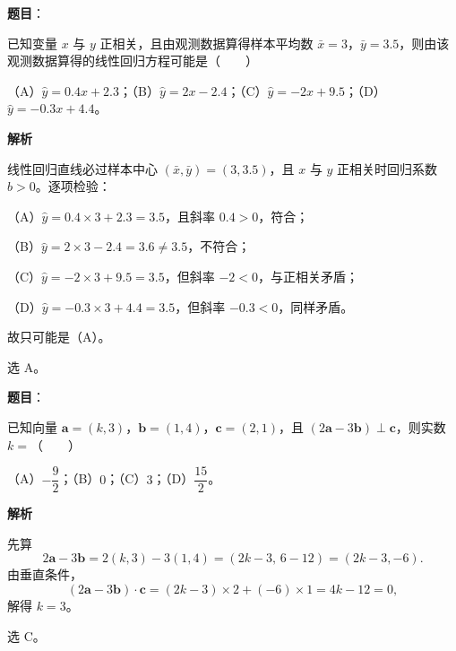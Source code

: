 \begin{answer}

\textbf{题目}：

已知变量 $x$ 与 $y$ 正相关，且由观测数据算得样本平均数 $\bar x=3$，$\bar y=3.5$，则由该观测数据算得的线性回归方程可能是\mbox{（　　）}

（A）$\hat y=0.4x+2.3$；（B）$\hat y=2x-2.4$；（C）$\hat y=-2x+9.5$；（D）$\hat y=-0.3x+4.4$。

\textbf{解析}

线性回归直线必过样本中心 $(\bar x,\bar y)=(3,3.5)$，且 $x$ 与 $y$ 正相关时回归系数 $\hat b>0$。逐项检验：

（A）$\hat y=0.4\times3+2.3=3.5$，且斜率 $0.4>0$，符合；

（B）$\hat y=2\times3-2.4=3.6\neq3.5$，不符合；

（C）$\hat y=-2\times3+9.5=3.5$，但斜率 $-2<0$，与正相关矛盾；

（D）$\hat y=-0.3\times3+4.4=3.5$，但斜率 $-0.3<0$，同样矛盾。

故只可能是（A）。

选 A。


\end{answer}
\begin{answer}

\textbf{题目}：

已知向量 $\boldsymbol a=(k,3)$，$\boldsymbol b=(1,4)$，$\boldsymbol c=(2,1)$，且 $(2\boldsymbol a-3\boldsymbol b)\perp\boldsymbol c$，则实数 $k=$\mbox{（　　）}

（A）$-\dfrac92$；（B）$0$；（C）$3$；（D）$\dfrac{15}2$。

\textbf{解析}

先算
\nopagebreak[4]
\[2\boldsymbol a-3\boldsymbol b=2(k,3)-3(1,4)=(2k-3,\,6-12)=(2k-3,-6).\]
由垂直条件，
\nopagebreak[4]
\[(2\boldsymbol a-3\boldsymbol b)\cdot\boldsymbol c=(2k-3)\times2+(-6)\times1=4k-12=0,\]
解得 $k=3$。

选 C。


\end{answer}
